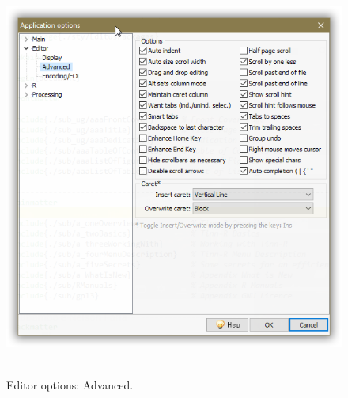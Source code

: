 \begin{figure}[H]
  \includegraphics[scale=0.50]{./res/app_editor_advanced.png}~~
  \caption{Editor options: Advanced.}
  \label{fig:editor_advanced}
\end{figure}

